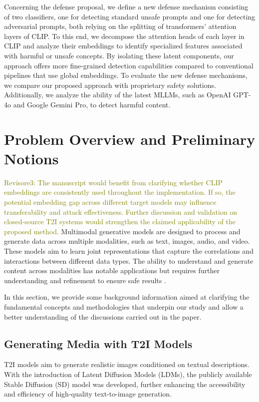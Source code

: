 \documentclass[acmsmall]{acmart}
\newcommand{\revthree}[1]{\textcolor{olive}{Revisore3: #1}}
\begin{document}
Concerning the defense proposal, we define a new defense mechanism consisting of two classifiers, one for detecting standard unsafe prompts and one for detecting adversarial prompts, both relying on the splitting of transformers' attention
layers of CLIP. To this end, we decompose the attention heads of each layer in CLIP and analyze their embeddings to identify specialized features associated with harmful or unsafe concepts. By isolating these latent components, our approach offers more fine-grained detection capabilities compared to conventional pipelines that use global embeddings. 
To evaluate the new defense mechanisms, we compare our proposed approach with proprietary safety solutions. Additionally, we analyze the ability of the latest MLLMs, such as OpenAI GPT-4o and Google Gemini Pro, to detect harmful content.

\vspace{-0.7em}
\section{Problem Overview and Preliminary Notions }\label{sec:preliminaries}
\revthree{The manuscript would benefit from clarifying whether CLIP embeddings are consistently used throughout the implementation. If so, the potential embedding gap across different target models may influence transferability and attack effectiveness. Further discussion and validation on closed-source T2I systems would strengthen the claimed applicability of the proposed method.}
Multimodal generative models are designed to process and generate data across multiple modalities, such as text, images, audio, and video. These models aim to learn joint representations that capture the correlations and interactions between different data types. The ability to understand and generate content across modalities has notable applications but requires further understanding and refinement to ensure safe results \cite{baltruvsaitis2018multimodal}.

In this section, we provide some background information aimed at clarifying the fundamental concepts and methodologies that underpin our study and allow a better understanding of the discussions carried out in the paper.
\subsection{Generating Media with T2I Models}\label{subsec:t2i}
T2I models aim to generate realistic images conditioned on textual descriptions. With the introduction of Latent Diffusion Models (LDMs), the publicly available Stable Diffusion (SD) \cite{stable-diffusion-v1-4} model was developed, further enhancing the accessibility and efficiency of high-quality text-to-image generation.
\end{document}
